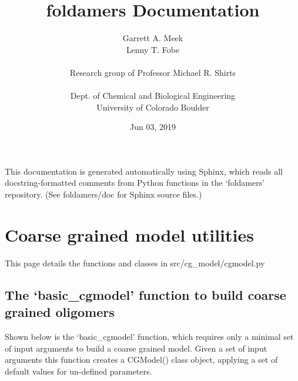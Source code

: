\documentclass[letterpaper,12pt,english,openany,oneside]{sphinxmanual}
\title{foldamers Documentation}
\date{Jun 03, 2019}
\author{Garrett A. Meek\\Lenny T. Fobe\\ \\Research group of Professor Michael R. Shirts\\ \\Dept. of Chemical and Biological Engineering\\University of Colorado Boulder}
\begin{document}
\pagestyle{empty}
\sphinxmaketitle
\pagestyle{plain}
\sphinxtableofcontents
\pagestyle{normal}
\label{\detokenize{index::doc}}


This documentation is generated automatically using Sphinx, which reads all docstring-formatted comments from Python functions in the ‘foldamers’ repository.  (See foldamers/doc for Sphinx source files.)


\chapter{Coarse grained model utilities}
\label{\detokenize{cg_model:coarse-grained-model-utilities}}\label{\detokenize{cg_model::doc}}
This page details the functions and classes in src/cg\_model/cgmodel.py


\section{The ‘basic\_cgmodel’ function to build coarse grained oligomers}
\label{\detokenize{cg_model:the-basic-cgmodel-function-to-build-coarse-grained-oligomers}}
Shown below is the ‘basic\_cgmodel’ function, which requires only a minimal set of input arguments to build a coarse grained model.  Given a set of input arguments this function creates a CGModel() class object, applying a set of default values for un-defined parameters.

\label{\detokenize{cg_model:module-cg_model.cgmodel}}
\end{document}
